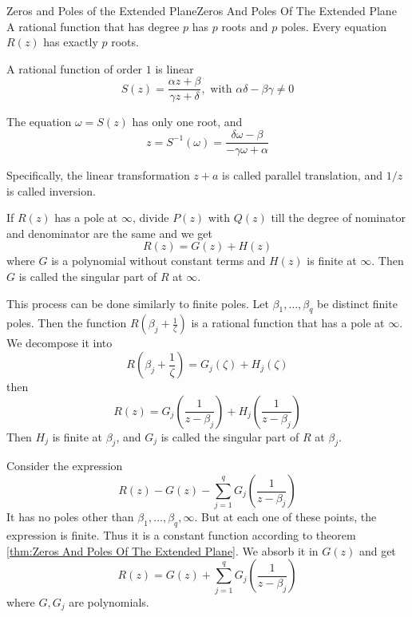\documentclass[../main.tex]{subfiles}
\begin{document}
\begin{theorem}{Zeros and Poles of the Extended Plane}{Zeros And Poles Of The Extended Plane}
A rational function that has degree $p$ has $p$ roots and $p$ poles. Every equation $R(z)$ has exactly $p$ roots.
\end{theorem}

A rational function of order  $1$ is linear
\begin{equation}
S(z) = \frac{\alpha z+\beta}{\gamma z+\delta}, \text{ with }\alpha \delta-\beta \gamma\neq 0
\end{equation}

The equation $\omega = S(z)$ has only one root, and 
\begin{equation*}
z = S^{-1}(\omega) = \frac{\delta \omega - \beta}{-\gamma \omega + \alpha}
\end{equation*}

Specifically, the linear transformation $z+a$ is called parallel translation, and $1 / z$ is called inversion.

If $R(z)$ has a pole at $\infty $, divide $P(z)$ with $Q(z)$ till the degree of nominator and denominator are the same and we get
\begin{equation*}
R(z) = G(z) + H(z)
\end{equation*}
where $G$ is a polynomial without constant terms and $H(z)$ is finite at $\infty $. Then $G$ is called the singular part of $R$ at $\infty $.

This process can be done similarly to finite poles. Let $\beta_1, \ldots ,\beta_q$ be distinct finite poles. Then the function $\displaystyle R(\beta_j + \frac{1}{\zeta})$ is a rational function that has a pole at $\infty $. We decompose it into
\begin{equation*}
	R(\beta_j + \frac{1}{\zeta}) = G_j(\zeta) + H_j(\zeta)
\end{equation*}
then
\begin{equation*}
	R(z) =G_j (\frac{1}{z-\beta_j}) + H_j(\frac{1}{z-\beta_j})
\end{equation*}
Then $H_j$ is finite at $\beta_j$, and $G_j$ is called the singular part of $R$ at $\beta_j$.

Consider the expression
\begin{equation*}
	R(z) - G(z) - \sum_{j=1}^{q} G_j(\frac{1}{z-\beta_j})
\end{equation*}
It has no poles other than $\beta_1, \ldots ,\beta_q,\infty $. But at each one of these points, the expression is finite. Thus it is a constant function according to theorem \ref{thm:Zeros And Poles Of The Extended Plane}. We absorb it in $G(z)$ and get
\begin{equation}
	R(z) = G(z) + \sum_{j=1}^{q} G_j(\frac{1}{z-\beta_j})
\end{equation}
where $G,G_j$ are polynomials.
\end{document}
